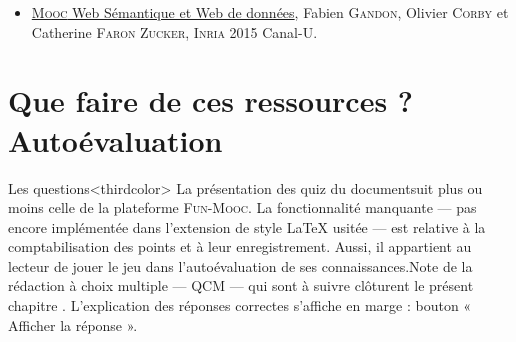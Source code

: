 \begin{gofurther}[before skip=12pt]
\begin{itemize}
\end{itemize}
\vspace*{2pt}
\begin{itemize}\jazzitem
\item \href{https://www.canal-u.tv/producteurs/inria/cours_en_ligne/web_semantique_et_web_de_donnees}{\textsc{Mooc} Web Sémantique et Web de données}, Fabien \textsc{Gandon}, Olivier \textsc{Corby} et Catherine \textsc{Faron Zucker}, \textsc{Inria} 2015 Canal-U.
\end{itemize}
\end{gofurther}



\section[Que faire de ces ressources ? Quiz]{Que faire de ces ressources ? Autoévaluation}
\label{sec:II.5}

\vspace*{-4pt}
Les questions\caution[b]<thirdcolor>{%
La présentation des quiz du document\linebreak suit plus ou moins celle de la platefor\-me \textsc{Fun-Mooc}. La fonctionnalité manquante --- pas encore implémentée dans l'extension de style \LaTeX{} usitée --- est relative à la comptabilisation des points et à leur enregistrement. Aussi, il appartient au lecteur de jouer le jeu dans l'auto\-évaluation de ses connaissances.}{Note de la rédaction}
à choix multiple
--- QCM --- qui sont à suivre clôturent le présent chapitre . 
L'explication des réponses correctes s'affiche en marge : bouton « Afficher la réponse ».
\parnotes

\vspace{6pt}

